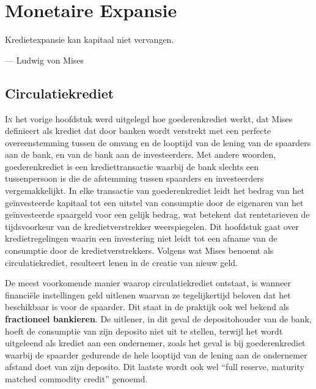 \hypertarget{monetaire-expansie}{%
\chapter{Monetaire Expansie}\label{monetaire-expansie}}

\begin{blockquotebox}
    Kredietexpansie kan kapitaal niet vervangen.\footnotemark
    \par\raggedleft--- Ludwig von Mises
\end{blockquotebox}

\vspace{-1em}
\hypertarget{circulatiekrediet}{%
\section{Circulatiekrediet}\label{circulatiekrediet}}

\lettrine{I}n het vorige hoofdstuk werd uitgelegd hoe goederenkrediet werkt, dat Mises definieert als krediet dat door banken wordt verstrekt met een perfecte overeenstemming tussen de omvang en de looptijd van de lening van de spaarders aan de bank, en van de bank aan de investeerders. Met andere woorden, goederenkrediet is een krediettransactie waarbij de bank slechts een tussenpersoon is die de afstemming tussen spaarders en investeerders vergemakkelijkt. In elke transactie van goederenkrediet leidt het bedrag van het geïnvesteerde kapitaal tot een uitstel van consumptie door de eigenaren van het geïnvesteerde spaargeld voor een gelijk bedrag, wat betekent dat rentetarieven de tijdsvoorkeur van de kredietverstrekker weerspiegelen. Dit hoofdstuk gaat over kredietregelingen waarin een investering niet leidt tot een afname van de consumptie door de kredietverstrekkers. Volgens wat Mises benoemt als circulatiekrediet, resulteert lenen in de creatie van nieuw geld.

De meest voorkomende manier waarop circulatiekrediet ontstaat, is wanneer financiële instellingen geld uitlenen waarvan ze tegelijkertijd beloven dat het beschikbaar is voor de spaarder. Dit staat in de praktijk ook wel bekend als \textbf{fractioneel bankieren}. De uitlener, in dit geval de depositohouder van de bank, hoeft de consumptie van zijn deposito niet uit te stellen, terwijl het wordt uitgeleend als krediet aan een ondernemer, zoals het geval is bij goederenkrediet waarbij de spaarder gedurende de hele looptijd van de lening aan de ondernemer afstand doet van zijn deposito. Dit laatste wordt ook wel ``full reserve, maturity matched commodity credit'' genoemd.

